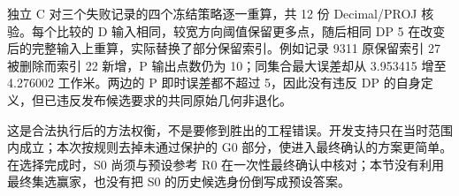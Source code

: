 独立 C 对三个失败记录的四个冻结策略逐一重算，共 12 份 Decimal/PROJ 核验。每个比较的 D 输入相同，较宽方向阈值保留更多点，随后相同 DP 5 在改变后的完整输入上重算，实际替换了部分保留索引。例如记录 9311 原保留索引 27 被删除而索引 22 新增，P 输出点数仍为 10；同集合最大误差却从 3.953415 增至 4.276002 工作米。两边的 P 即时误差都不超过 5，因此没有违反 DP 的自身定义，但已违反发布候选要求的共同原始几何非退化。

这是合法执行后的方法权衡，不是要修到胜出的工程错误。开发支持只在当时范围内成立；本次按规则去掉未通过保护的 G0 部分，使进入最终确认的方案更简单。在选择完成时，S0 尚须与预设参考 R0 在一次性最终确认中核对；本节没有利用最终集选赢家，也没有把 S0 的历史候选身份倒写成预设答案。
